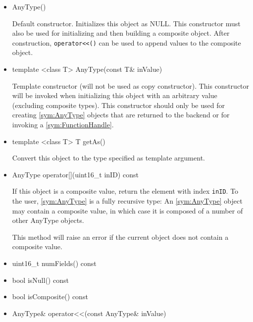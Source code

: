 \begin{itemize}
	\item
		\begin{cppsnippet}
		AnyType()
		\end{cppsnippet}

		Default constructor. Initializes this object as NULL. This constructor must also be used for initializing and then building a composite object. After construction, \texttt{operator<\/<()} can be used to append values to the composite object.

	\item
		\begin{cppsnippet}
		template <class T> AnyType(const T& inValue)
		\end{cppsnippet}
		
		Template constructor (will not be used as copy constructor). This constructor will be invoked when initializing this object with an arbitrary value (excluding composite types). This constructor should only be used for creating \ref{sym:AnyType} objects that are returned to the backend or for invoking a \ref{sym:FunctionHandle}.
	
	\item
		\begin{cppsnippet}
		template <class T> T getAs()
		\end{cppsnippet}
		
		Convert this object to the type specified as template argument.

	\item
		\begin{cppsnippet}
		AnyType operator[](uint16_t inID) const
		\end{cppsnippet}
		
		If this object is a composite value, return the element with index \texttt{inID}. To the user, \ref{sym:AnyType} is a fully recursive type: An \ref{sym:AnyType} object may contain a composite value, in which case it is composed of a number of other AnyType objects.
		
		This method will raise an error if the current object does not contain a composite value.

	\item
		\begin{cppsnippet}
		uint16_t numFields() const
		\end{cppsnippet}

	\item
		\begin{cppsnippet}
		bool isNull() const
		\end{cppsnippet}

	\item
		\begin{cppsnippet}
		bool isComposite() const
		\end{cppsnippet}

	\item
		\begin{cppsnippet}
		AnyType& operator<<(const AnyType& inValue)
		\end{cppsnippet}
\end{itemize}

